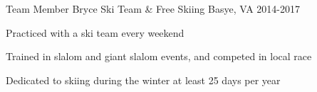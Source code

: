 \begin{cventries}
  \cventry
    {Team Member}
    {Bryce Ski Team \& Free Skiing}
    {Basye, VA}
    {2014-2017}
    {
      \begin{cvitems}
        \item{Practiced with a ski team every weekend}
        \item{Trained in slalom and giant slalom events, and competed in local race}
        \item{Dedicated to skiing during the winter at least 25 days per year}
      \end{cvitems}
    }
    \cventry
\end{cventries}
